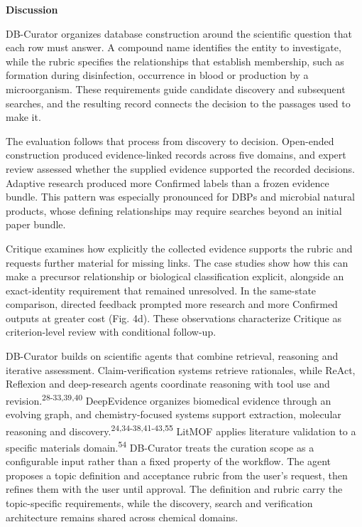 \documentclass[
]{article}
\begin{document}
\vspace*{\fill}
\restoregeometry

\textbf{Discussion}

DB-Curator organizes database construction around the scientific question that each row must answer. A compound name identifies the entity to investigate, while the rubric specifies the relationships that establish membership, such as formation during disinfection, occurrence in blood or production by a microorganism. These requirements guide candidate discovery and subsequent searches, and the resulting record connects the decision to the passages used to make it.

The evaluation follows that process from discovery to decision. Open-ended construction produced evidence-linked records across five domains, and expert review assessed whether the supplied evidence supported the recorded decisions. Adaptive research produced more Confirmed labels than a frozen evidence bundle. This pattern was especially pronounced for DBPs and microbial natural products, whose defining relationships may require searches beyond an initial paper bundle.

Critique examines how explicitly the collected evidence supports the rubric and requests further material for missing links. The case studies show how this can make a precursor relationship or biological classification explicit, alongside an exact-identity requirement that remained unresolved. In the same-state comparison, directed feedback prompted more research and more Confirmed outputs at greater cost (Fig. 4d). These observations characterize Critique as criterion-level review with conditional follow-up.

DB-Curator builds on scientific agents that combine retrieval, reasoning and iterative assessment. Claim-verification systems retrieve rationales, while ReAct, Reflexion and deep-research agents coordinate reasoning with tool use and revision.\textsuperscript{28-33,39,40} DeepEvidence organizes biomedical evidence through an evolving graph, and chemistry-focused systems support extraction, molecular reasoning and discovery.\textsuperscript{24,34-38,41-43,55} LitMOF applies literature validation to a specific materials domain.\textsuperscript{54} DB-Curator treats the curation scope as a configurable input rather than a fixed property of the workflow. The agent proposes a topic definition and acceptance rubric from the user's request, then refines them with the user until approval. The definition and rubric carry the topic-specific requirements, while the discovery, search and verification architecture remains shared across chemical domains.
\end{document}
